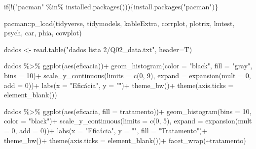 \documentclass[
  letterpaper,
  DIV=11,
  numbers=noendperiod]{scrartcl}
\newenvironment{Shaded}{\begin{snugshade}}{\end{snugshade}}
\newcommand{\AttributeTok}[1]{\textcolor[rgb]{0.40,0.45,0.13}{#1}}
\newcommand{\ControlFlowTok}[1]{\textcolor[rgb]{0.00,0.23,0.31}{#1}}
\newcommand{\DecValTok}[1]{\textcolor[rgb]{0.68,0.00,0.00}{#1}}
\newcommand{\FunctionTok}[1]{\textcolor[rgb]{0.28,0.35,0.67}{#1}}
\newcommand{\NormalTok}[1]{\textcolor[rgb]{0.00,0.23,0.31}{#1}}
\newcommand{\OtherTok}[1]{\textcolor[rgb]{0.00,0.23,0.31}{#1}}
\newcommand{\SpecialCharTok}[1]{\textcolor[rgb]{0.37,0.37,0.37}{#1}}
\newcommand{\StringTok}[1]{\textcolor[rgb]{0.13,0.47,0.30}{#1}}
\begin{document}
\begin{Shaded}
\begin{Highlighting}[]
\ControlFlowTok{if}\NormalTok{(}\SpecialCharTok{!}\NormalTok{(}\StringTok{"pacman"} \SpecialCharTok{\%in\%} \FunctionTok{installed.packages}\NormalTok{()))\{}\FunctionTok{install.packages}\NormalTok{(}\StringTok{"pacman"}\NormalTok{)\}}

\NormalTok{pacman}\SpecialCharTok{::}\FunctionTok{p\_load}\NormalTok{(tidyverse, tidymodels, kableExtra, corrplot, plotrix, lmtest, psych, car, phia, cowplot)}


\NormalTok{dados }\OtherTok{\textless{}{-}} \FunctionTok{read.table}\NormalTok{(}\StringTok{"dados lista 2/Q02\_data.txt"}\NormalTok{, }\AttributeTok{header=}\NormalTok{T)}

\NormalTok{dados }\SpecialCharTok{\%\textgreater{}\%}
  \FunctionTok{ggplot}\NormalTok{(}\FunctionTok{aes}\NormalTok{(eficacia))}\SpecialCharTok{+}
  \FunctionTok{geom\_histogram}\NormalTok{(}\AttributeTok{color =} \StringTok{"black"}\NormalTok{, }\AttributeTok{fill =} \StringTok{"gray"}\NormalTok{, }\AttributeTok{bins =} \DecValTok{10}\NormalTok{)}\SpecialCharTok{+}
  \FunctionTok{scale\_y\_continuous}\NormalTok{(}\AttributeTok{limits =} \FunctionTok{c}\NormalTok{(}\DecValTok{0}\NormalTok{, }\DecValTok{9}\NormalTok{),}
                     \AttributeTok{expand =} \FunctionTok{expansion}\NormalTok{(}\AttributeTok{mult =} \DecValTok{0}\NormalTok{, }\AttributeTok{add =} \DecValTok{0}\NormalTok{))}\SpecialCharTok{+}
  \FunctionTok{labs}\NormalTok{(}\AttributeTok{x =} \StringTok{"Eficácia"}\NormalTok{, }\AttributeTok{y =} \StringTok{""}\NormalTok{)}\SpecialCharTok{+}
  \FunctionTok{theme\_bw}\NormalTok{()}\SpecialCharTok{+}
  \FunctionTok{theme}\NormalTok{(}\AttributeTok{axis.ticks =} \FunctionTok{element\_blank}\NormalTok{())}

\NormalTok{dados }\SpecialCharTok{\%\textgreater{}\%}
  \FunctionTok{ggplot}\NormalTok{(}\FunctionTok{aes}\NormalTok{(eficacia, }\AttributeTok{fill =}\NormalTok{ tratamento))}\SpecialCharTok{+}
  \FunctionTok{geom\_histogram}\NormalTok{(}\AttributeTok{bins =} \DecValTok{10}\NormalTok{, }\AttributeTok{color =} \StringTok{"black"}\NormalTok{)}\SpecialCharTok{+}
  \FunctionTok{scale\_y\_continuous}\NormalTok{(}\AttributeTok{limits =} \FunctionTok{c}\NormalTok{(}\DecValTok{0}\NormalTok{, }\DecValTok{5}\NormalTok{),}
                     \AttributeTok{expand =} \FunctionTok{expansion}\NormalTok{(}\AttributeTok{mult =} \DecValTok{0}\NormalTok{, }\AttributeTok{add =} \DecValTok{0}\NormalTok{))}\SpecialCharTok{+}
  \FunctionTok{labs}\NormalTok{(}\AttributeTok{x =} \StringTok{"Eficácia"}\NormalTok{, }\AttributeTok{y =} \StringTok{""}\NormalTok{, }\AttributeTok{fill =} \StringTok{"Tratamento"}\NormalTok{)}\SpecialCharTok{+}
  \FunctionTok{theme\_bw}\NormalTok{()}\SpecialCharTok{+}
  \FunctionTok{theme}\NormalTok{(}\AttributeTok{axis.ticks =} \FunctionTok{element\_blank}\NormalTok{())}\SpecialCharTok{+}
  \FunctionTok{facet\_wrap}\NormalTok{(}\SpecialCharTok{\textasciitilde{}}\NormalTok{tratamento)}


\end{Highlighting}
\end{Shaded}
\end{document}
